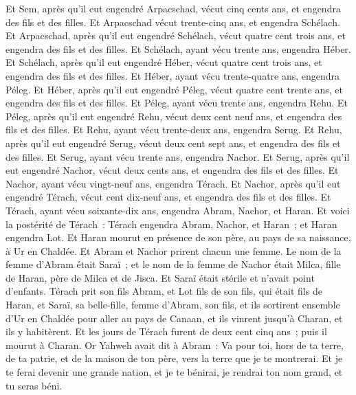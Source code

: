 \begin{multicols}{2}
Et Sem, après qu'il eut engendré Arpacschad, vécut cinq cents ans, et engendra des fils et des filles.
Et Arpacschad vécut trente-cinq ans, et engendra Schélach.
Et Arpacschad, après qu'il eut engendré Schélach, vécut quatre cent trois ans, et engendra des fils et des filles.
Et Schélach, ayant vécu trente ans, engendra Héber.
Et Schélach, après qu'il eut engendré Héber, vécut quatre cent trois ans, et engendra des fils et des filles.
Et Héber, ayant vécu trente-quatre ans, engendra Péleg.
Et Héber, après qu'il eut engendré Péleg, vécut quatre cent trente ans, et engendra des fils et des filles.
Et Péleg, ayant vécu trente ans, engendra Rehu.
Et Péleg, après qu'il eut engendré Rehu, vécut deux cent neuf ans, et engendra des fils et des filles.
Et Rehu, ayant vécu trente-deux ans, engendra Serug.
Et Rehu, après qu'il eut engendré Serug, vécut deux cent sept ans, et engendra des fils et des filles.
Et Serug, ayant vécu trente ans, engendra Nachor.
Et Serug, après qu'il eut engendré Nachor, vécut deux cents ans, et engendra des fils et des filles.
Et Nachor, ayant vécu vingt-neuf ans, engendra Térach.
Et Nachor, après qu'il eut engendré Térach, vécut cent dix-neuf ans, et engendra des fils et des filles.
Et Térach, ayant vécu soixante-dix ans, engendra Abram, Nachor, et Haran.
Et voici la postérité de Térach~: Térach engendra Abram, Nachor, et Haran~; et Haran engendra Lot.
Et Haran mourut en présence de son père, au pays de sa naissance, à Ur en Chaldée.
Et Abram et Nachor prirent chacun une femme. Le nom de la femme d'Abram était Saraï~; et le nom de la femme de Nachor était Milca, fille de Haran, père de Milca et de Jisca.
Et Saraï était stérile et n'avait point d'enfants.
Térach prit son fils Abram, et Lot fils de son fils, qui était fils de Haran, et Saraï, sa belle-fille, femme d'Abram, son fils, et ils sortirent ensemble d'Ur en Chaldée pour aller au pays de Canaan, et ils vinrent jusqu'à Charan, et ils y habitèrent.
Et les jours de Térach furent de deux cent cinq ans~; puis il mourut à Charan.
\VerseOne{}Or Yahweh avait dit à Abram~: Va pour toi, hors de ta terre, de ta patrie, et de la maison de ton père, vers la terre que je te montrerai.
Et je te ferai devenir une grande nation, et je te bénirai, je rendrai ton nom grand, et tu seras béni.

\end{multicols}
